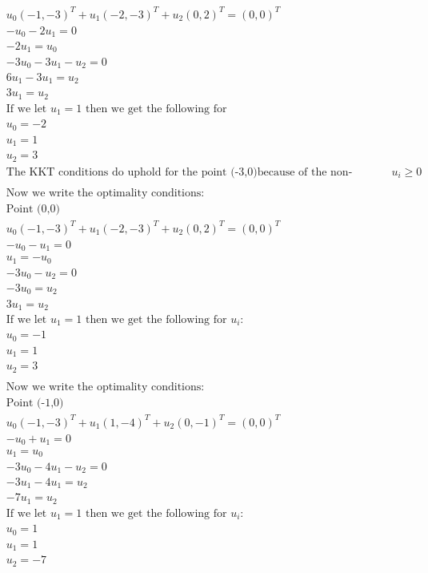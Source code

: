 \documentclass[12pt]{article}
\begin{document}
    \begin{align*}
        &u_0 (-1,-3)^T + u_1 (-2,-3)^T + u_2 (0,2)^T = (0,0)^T\\
        &-u_0 - 2u_1 = 0\\
        &-2u_1 = u_0\\
        &-3u_0 - 3u_1 - u_2 = 0\\
        &6u_1-3u_1 = u_2\\
        &3u_1 = u_2 \\
        &\text{If we let } u_1 = 1 \text{ then we get the following for }\\
        &u_0 = -2\\
        &u_1 = 1\\
        &u_2 = 3\\
        &\text{The KKT conditions do uphold for the point (-3,0)because of the non-negative condition is not upheld } u_i \geq 0\\ \\
        &\text{Now we write the optimality conditions: }\\
        &\text{Point (0,0)}\\
        & u_0 (-1,-3)^T + u_1 (-2,-3)^T + u_2 (0,2)^T = (0,0)^T\\
        &-u_0 - u_1 = 0\\
        &u_1 = -u_0\\
        &-3u_0 - u_2 = 0\\
        &-3u_0= u_2\\
        &3u_1 = u_2 \\
        &\text{If we let } u_1 = 1 \text{ then we get the following for }u_i:\\
        &u_0 = -1\\
        &u_1 = 1\\
        &u_2 = 3\\ \\
        &\text{Now we write the optimality conditions: }\\
        &\text{Point (-1,0)}\\
        & u_0 (-1,-3)^T + u_1 (1,-4)^T + u_2 (0,-1)^T = (0,0)^T\\
        &-u_0 + u_1 = 0\\
        &u_1 = u_0\\
        &-3u_0 - 4u_1 - u_2 = 0\\
        &-3u_1 - 4 u_1= u_2\\
        &-7u_1 = u_2 \\
        &\text{If we let } u_1 = 1 \text{ then we get the following for }u_i:\\
        &u_0 = 1\\
        &u_1 = 1\\
        &u_2 = -7\\
    \end{align*}
\end{document}
